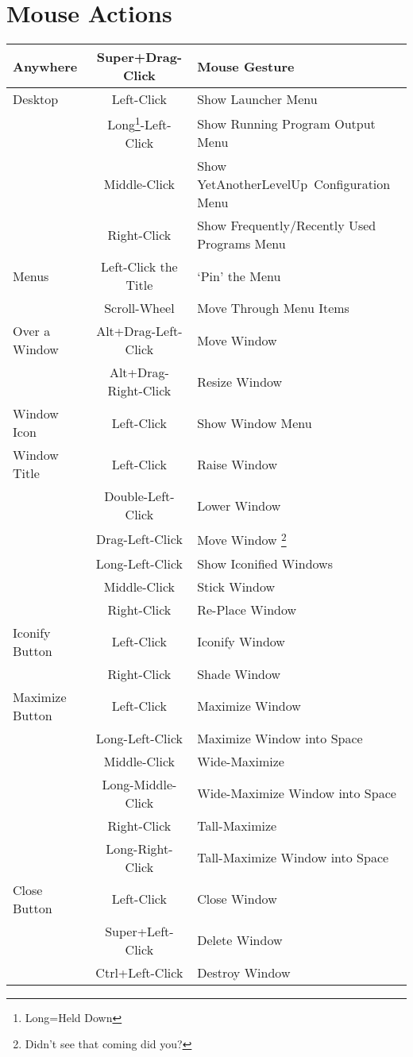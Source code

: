 \documentclass[a4paper,11pt]{article}
\newcommand{\yalu}{YetAnotherLevelUp}
\begin{document}
	\section{Mouse Actions}
		\begin{longtable}{ l c l }
			\toprule
				Anywhere & Super+Drag-Click & Mouse Gesture \\
			\midrule
				Desktop & Left-Click & Show Launcher Menu \\
				        & Long\footnote{Long=Held Down}-Left-Click
				        & Show Running Program Output Menu \\
				        & Middle-Click & Show \yalu\ Configuration Menu \\
				        & Right-Click & Show Frequently/Recently Used Programs Menu \\
			\midrule
				Menus & Left-Click the Title & `Pin' the Menu \\
				      & Scroll-Wheel & Move Through Menu Items \\
			\midrule
				Over a Window & Alt+Drag-Left-Click & Move Window \\
				              & Alt+Drag-Right-Click & Resize Window \\
			\midrule
				Window Icon & Left-Click & Show Window Menu \\
			\midrule
				Window Title & Left-Click & Raise Window \\
				             & Double-Left-Click & Lower Window \\
				             & Drag-Left-Click & Move Window
				               \footnote{Didn't see that coming did you?} \\
				             & Long-Left-Click & Show Iconified Windows \\
				             & Middle-Click & Stick Window \\
				             & Right-Click & Re-Place Window \\
			\midrule
				Iconify Button & Left-Click & Iconify Window \\
				               & Right-Click & Shade Window \\
			\midrule
				Maximize Button & Left-Click & Maximize Window \\
				                & Long-Left-Click & Maximize Window into Space\\
				                & Middle-Click & Wide-Maximize \\
				                & Long-Middle-Click & Wide-Maximize Window into Space\\
				                & Right-Click & Tall-Maximize \\
				                & Long-Right-Click & Tall-Maximize Window into Space\\
			\midrule
				Close Button & Left-Click & Close Window \\
				             & Super+Left-Click & Delete Window \\
				             & Ctrl+Left-Click & Destroy Window \\
			\bottomrule
		\end{longtable}
	
\end{document}
